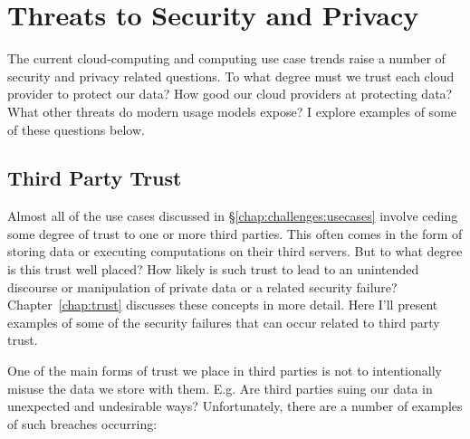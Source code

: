 \section{Threats to Security and Privacy}
\label{chap:challenges:threats}

The current cloud-computing and computing use case trends raise a
number of security and privacy related questions. To what degree must
we trust each cloud provider to protect our data? How good our cloud
providers at protecting data? What other threats do modern usage
models expose? I explore examples of some of these questions below.

\subsection{Third Party Trust}

Almost all of the use cases discussed in
\S\ref{chap:challenges:usecases} involve ceding some degree of trust to
one or more third parties. This often comes in the form of storing
data or executing computations on their third servers. But to what
degree is this trust well placed? How likely is such trust to lead to
an unintended discourse or manipulation of private data or a related
security failure? Chapter~\ref{chap:trust} discusses these concepts in
more detail. Here I'll present examples of some of the security
failures that can occur related to third party trust.

One of the main forms of trust we place in third parties is not to
intentionally misuse the data we store with them. E.g. Are third
parties suing our data in unexpected and undesirable ways?
Unfortunately, there are a number of examples of such breaches
occurring:

